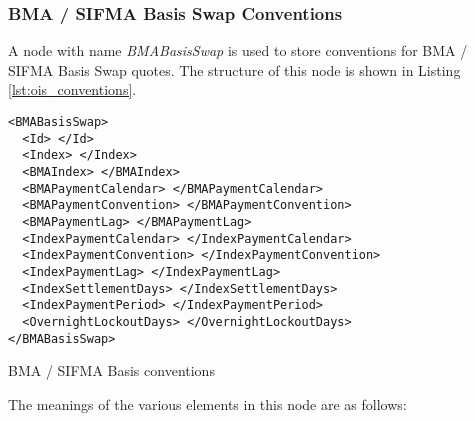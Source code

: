 \subsubsection{BMA / SIFMA Basis Swap Conventions}

A node with name \emph{BMABasisSwap} is used to store conventions for BMA / SIFMA Basis Swap quotes. The structure of this
node is shown in Listing \ref{lst:ois_conventions}.

\begin{listing}[H]
\begin{verbatim}
<BMABasisSwap>
  <Id> </Id>
  <Index> </Index>
  <BMAIndex> </BMAIndex>
  <BMAPaymentCalendar> </BMAPaymentCalendar>
  <BMAPaymentConvention> </BMAPaymentConvention>
  <BMAPaymentLag> </BMAPaymentLag>
  <IndexPaymentCalendar> </IndexPaymentCalendar>
  <IndexPaymentConvention> </IndexPaymentConvention>
  <IndexPaymentLag> </IndexPaymentLag>
  <IndexSettlementDays> </IndexSettlementDays>
  <IndexPaymentPeriod> </IndexPaymentPeriod>
  <OvernightLockoutDays> </OvernightLockoutDays>
</BMABasisSwap>
\end{verbatim}
\caption{BMA / SIFMA Basis conventions}
\label{lst:bma_conventions}
\end{listing}

The meanings of the various elements in this node are as follows:


